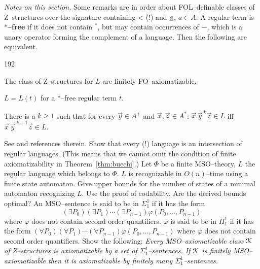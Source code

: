 {\it Notes on this section.} Some remarks are in order about FOL--definable
classes of Z--structures over the signature containing {\mtt <} (!) 
and $\underline{a}$, $a \in A$. A regular term is \textbf{$\ast$--free} if it 
does not contain $^{\ast}$, but may contain occurrences of 
$-$, which is a unary operator forming the complement of a language. 
Then the following are equivalent.
\begin{dingautolist}{192}
\item
The class of Z--structures for $L$ are finitely FO--axiomatizable.
\item
$L = L(t)$ for a $\ast$--free regular term $t$. 
\item
There is a $k \geq 1$ such that for every $\vec{y} \in A^+$ and 
$\vec{x}, \vec{z} \in A^{\ast}$: $\vec{x}\,{\vec{y}\,}^k\vec{z} \in L$ 
iff $\vec{x}\, {\vec{y}\,}^{k+1}\vec{z} \in L$.
\end{dingautolist}
See \cite{ebbinghausflum:finite} and references therein.
\vplatz
\exercise
Show that every (!) language is an intersection of regular languages.
(This means that we cannot omit the condition of finite axiomatizability 
in Theorem~\ref{thm:buechi}.)
\vplatz
\exercise
Let $\Phi$ be a finite MSO--theory, $L$ the regular language which
belongs to $\Phi$. $L$ is recognizable in $O(n)$--time
using a finite state automaton. Give upper bounds for the
number of states  of a minimal automaton recognizing $L$.
Use the proof of codability. Are the derived bounds optimal?
\vplatz
\exercise
An MSO--sentence is said to be in $\Sigma^1_1$ if it has the form
\begin{equation}
(\exists P_0)(\exists P_1)
\dotsb (\exists P_{n-1})\varphi(P_0, \dotsc, P_{n-1})
\end{equation}
where $\varphi$ does not contain second order quantifiers.
$\varphi$ is said to be in $\Pi^1_1$ if it has the form
$(\forall P_0)(\forall P_1) \dotsb (\forall P_{n-1})\varphi(P_0, %
\dotsc, P_{n-1})$ where $\varphi$ does not contain second order
quantifiers. Show the following: {\it Every MSO--axiomatizable 
class $\mathcal{K}$ of Z--structures is axiomatizable by a set of
$\Sigma^1_1$--sentences. If $\mathcal{K}$ is finitely MSO--axiomatizable 
then it is axiomatizable by finitely many $\Sigma^1_1$--sen\-ten\-ces.}

